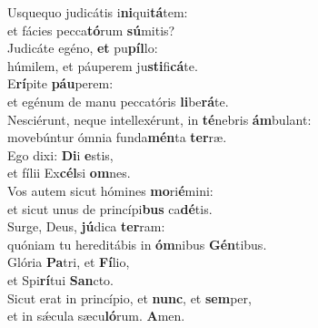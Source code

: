 \evenverse Usquequo judicátis i\textbf{ni}qui\textbf{tá}tem:~\*\\
\evenverse et fácies pecca\textbf{tó}rum \textbf{sú}mitis?\\
\oddverse Judicáte egéno, \textbf{et} pu\textbf{píl}lo:~\*\\
\oddverse húmilem, et páuperem ju\textbf{sti}fi\textbf{cá}te.\\
\evenverse E\textbf{rí}pite \textbf{páu}perem:~\*\\
\evenverse et egénum de manu peccatóris \textbf{li}be\textbf{rá}te.\\
\oddverse Nesciérunt, neque intellexérunt, in \textbf{té}nebris \textbf{ám}bulant:~\*\\
\oddverse movebúntur ómnia funda\textbf{mén}ta \textbf{ter}ræ.\\
\evenverse Ego dixi: \textbf{Di}i \textbf{e}stis,~\*\\
\evenverse et fílii Ex\textbf{cél}si \textbf{om}nes.\\
\oddverse Vos autem sicut hómines \textbf{mo}ri\textbf{é}mini:~\*\\
\oddverse et sicut unus de princípi\textbf{bus} ca\textbf{dé}tis.\\
\evenverse Surge, Deus, \textbf{jú}dica \textbf{ter}ram:~\*\\
\evenverse quóniam tu hereditábis in \textbf{óm}nibus \textbf{Gén}tibus.\\
\oddverse Glória \textbf{Pa}tri, et \textbf{Fí}lio,~\*\\
\oddverse et Spi\textbf{rí}tui \textbf{San}cto.\\
\evenverse Sicut erat in princípio, et \textbf{nunc}, et \textbf{sem}per,~\*\\
\evenverse et in sǽcula sæcu\textbf{ló}rum. \textbf{A}men.\\
